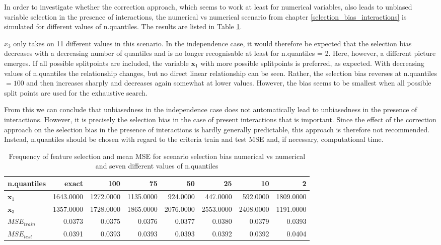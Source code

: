 In order to investigate whether the correction approach, which seems to work at least for numerical variables, also leads to unbiased variable selection in the presence of interactions, the numerical vs numerical scenario from chapter \ref{selection_bias_interactions} is simulated for different values of n.quantiles. The results are listed in Table \ref{tab:app_selection_bias_interaction}. 

$x_3$ only takes on 11 different values in this scenario. In the independence case, it would therefore be expected that the selection bias decreases with a decreasing number of quantiles and is no longer recognisable at least for n.quantiles = 2. Here, however, a different picture emerges. If all possible splitpoints are included, the variable $\textbf{x}_1$ with more possible splitpoints is preferred, as expected. With decreasing values of n.quantiles the relationship changes, but no direct linear relationship can be seen. Rather, the selection bias reverses at n.quantiles $= 100$ and then increases sharply and decreases again somewhat at lower values. However, the bias seems to be smallest when all possible split points are used for the exhaustive search. 

From this we can conclude that unbiasedness in the independence case does not automatically lead to unbiasedness in the presence of interactions. 
However, it is precisely the selection bias in the case of present interactions that is important. Since the effect of the correction approach on the selection bias in the presence of interactions is hardly generally predictable, this approach is therefore not recommended. Instead, n.quantiles should be chosen with regard to the criteria train and test MSE and, if necessary, computational time.


\begin{table}[!htb]
\centering \footnotesize
\begin{tabular}[t]{l|r|r|r|r|r|r|r}
\hline
n.quantiles  & exact & 100 & 75 & 50 & 25 & 10 & 2\\
\hline
$\textbf{x}_1$ & 1643.0000 & 1272.0000 & 1135.0000 & 924.0000 & 447.0000 & 592.0000 & 1809.0000\\
\hline
$\textbf{x}_3$ & 1357.0000 & 1728.0000 & 1865.0000 & 2076.0000 & 2553.0000 & 2408.0000 & 1191.0000\\
\hline
$MSE_{train}$ & 0.0373 & 0.0375 & 0.0376 & 0.0377 & 0.0380 & 0.0379 & 0.0393\\
\hline
$MSE_{test}$ & 0.0391 & 0.0393 & 0.0393 & 0.0393 & 0.0392 & 0.0392 & 0.0404\\
\hline
\end{tabular}
\caption{Frequency of feature selection and mean MSE for scenario selection bias numerical vs numerical and seven different values of n.quantiles}
\label{tab:app_selection_bias_interaction}
\end{table}





